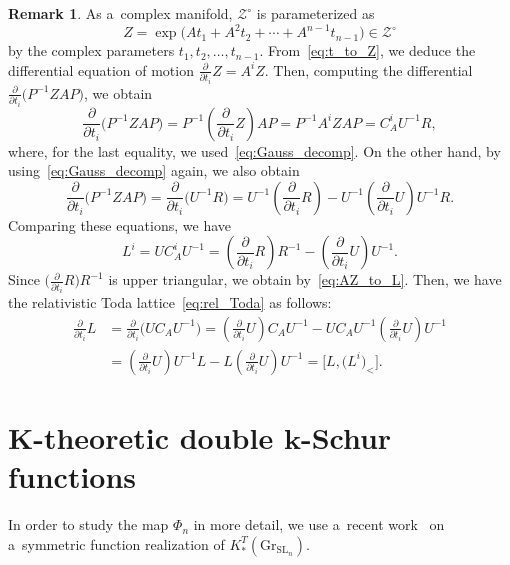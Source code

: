 \documentclass[10pt,a4paper]{amsart}
\numberwithin{equation}{section}
\newcommand{\Gr}{\mathrm{Gr}}
\newcommand{\SL}{\mathrm{SL}}
\theoremstyle{definition}
\newtheorem{Remark}[Theorem]{Remark}
\begin{document}
\begin{Remark}
As a~complex manifold, $\mathscr{Z}^\circ$ is parameterized as
\begin{equation}\label{eq:t_to_Z}
Z=\exp\bigl(
At_1+A^2t_2+\cdots+A^{n-1}t_{n-1}
\bigr)\in \mathscr{Z}^\circ
\end{equation}
by the complex parameters $t_1,t_2,\dots,t_{n-1}$.
From~\eqref{eq:t_to_Z}, we deduce the differential equation of motion $\frac{\partial }{\partial t_i}Z=A^iZ$.
Then, computing the differential $\frac{\partial}{\partial t_i}\bigl(P^{-1}ZAP\bigr)$, we obtain
\[
\frac{\partial}{\partial t_i}\bigl(P^{-1}ZAP\bigr)=P^{-1}\left(\frac{\partial}{\partial t_i}Z\right)AP=P^{-1}A^iZAP=
C_A^iU^{-1}R,
\]
where, for the last equality, we used~\eqref{eq:Gauss_decomp}.
On the other hand, by using~\eqref{eq:Gauss_decomp} again, we also obtain
\[
\frac{\partial}{\partial t_i}\bigl(P^{-1}ZAP\bigr)
=
\frac{\partial}{\partial t_i}\bigl(U^{-1}R\bigr)
=U^{-1}\left(\frac{\partial}{\partial t_i}R\right)-U^{-1}\left(\frac{\partial}{\partial t_i}U\right)U^{-1}R.
\]
Comparing these equations, we have
\[%
L^i=UC_A^iU^{-1}=
\left(\frac{\partial}{\partial t_i}R\right)R^{-1}-\left(\frac{\partial}{\partial t_i}U\right)U^{-1}.
\]
Since $\bigl(\frac{\partial}{\partial t_i}R\bigr)R^{-1}$ is upper triangular, we obtain  by~\eqref{eq:AZ_to_L}. Then, we have the relativistic Toda lattice~\eqref{eq:rel_Toda} as follows:
\begin{align*}%
\frac{\partial}{\partial t_i}L
&
=
\frac{\partial}{\partial t_i}\bigl(UC_AU^{-1}\bigr)=
\left(\frac{\partial}{\partial t_i}U\right)C_AU^{-1}-UC_AU^{-1}
\left(\frac{\partial}{\partial t_i}U\right)U^{-1}
\\
&=
\left(\frac{\partial}{\partial t_i}U\right)U^{-1}L-L
\left(\frac{\partial}{\partial t_i}U\right)U^{-1}=\big[L,\bigl(L^i\bigr)_{<}\big].
\end{align*}
\end{Remark}




\section[K-theoretic double k-Schur functions]{$\boldsymbol{K}$-theoretic double $\boldsymbol{k}$-Schur functions}\label{sec:Kk}
In order to study
the map $\Phi_n$
in more detail,
we use a~recent
work~\cite{ISY} on a~symmetric function realization
of $K_*^T(\Gr_{\SL_n})$.
\end{document}
